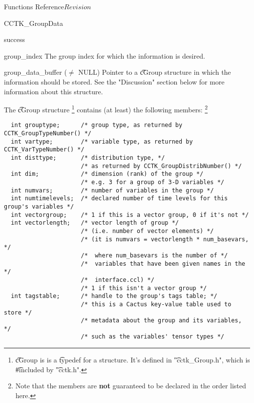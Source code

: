 \begin{cactuspart}{ Functions Reference}{}{$Revision$}
\begin{FunctionDescription}{CCTK\_GroupData}
\begin{ResultSection}
\begin{Result}{0}
success
\end{Result}
\end{ResultSection}

\begin{ParameterSection}
\begin{Parameter}{group\_index}
The group index for which the information is desired.
\end{Parameter}
\begin{Parameter}{group\_data\_buffer ($\ne$ NULL)}
Pointer to a {\t cGroup} structure in which the information should be
stored.  See the "Discussion" section below for more information about
this structure.
\end{Parameter}
\end{ParameterSection}

\begin{Discussion}
The {\t cGroup} structure%
\footnote{%
         {\t cGroup} is is a {\t typedef} for a structure.
         It's defined in {\t "cctk\_Group.h"}, which is
         {\t \#include}d by {\t "cctk.h"}.
         }%
{} contains (at least) the following members:%
\footnote{%
         Note that the members are {\bf not\/}
         guaranteed to be declared in the order
         listed here.
         }%
\begin{verbatim}
  int grouptype;      /* group type, as returned by CCTK_GroupTypeNumber() */
  int vartype;        /* variable type, as returned by CCTK_VarTypeNumber() */
  int disttype;       /* distribution type, */
                      /* as returned by CCTK_GroupDistribNumber() */
  int dim;            /* dimension (rank) of the group */
                      /* e.g. 3 for a group of 3-D variables */
  int numvars;        /* number of variables in the group */
  int numtimelevels;  /* declared number of time levels for this group's variables */
  int vectorgroup;    /* 1 if this is a vector group, 0 if it's not */
  int vectorlength;   /* vector length of group */
                      /* (i.e. number of vector elements) */
                      /* (it is numvars = vectorlength * num_basevars, */
                      /*  where num_basevars is the number of */
                      /*  variables that have been given names in the */
                      /*  interface.ccl) */
                      /* 1 if this isn't a vector group */
  int tagstable;      /* handle to the group's tags table; */
                      /* this is a Cactus key-value table used to store */
                      /* metadata about the group and its variables, */
                      /* such as the variables' tensor types */
\end{verbatim}
\end{Discussion}


\end{FunctionDescription}
\end{cactuspart}
